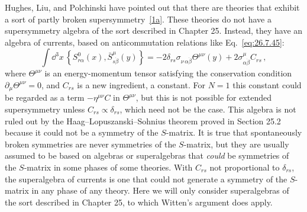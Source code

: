 Hughes, Liu, and Polchinski have pointed out that there are theories that
exhibit a sort of partly broken
supersymmetry~\hyperref[ch29-ref-1a]{[1a]}. These theories do not have a
supersymmetry algebra of the sort described in Chapter 25. Instead, they
have an algebra of currents, based on anticommutation relations like
Eq.~\eqref{eq:26.7.45}:
\[
  \int \dd^3x\,
  \left\{S^0_{r\alpha}(x),\bar S^\mu_{s\dot\beta}(y)\right\}
  =
  -2\delta_{rs}\sigma_{\nu\,\alpha\dot\beta}
    \Theta^{\mu\nu}(y)
  +2\sigma^\mu_{\alpha\dot\beta}C_{rs}\,,
\]
where \(\Theta^{\mu\nu}\) is an energy-momentum tensor satisfying the
conservation condition \(\partial_\mu\Theta^{\mu\nu}=0\), and \(C_{rs}\)
is a new ingredient, a constant. For \(N=1\) this constant could be
regarded as a term \(-\eta^{\mu\nu}C\) in \(\Theta^{\mu\nu}\), but this is
not possible for extended supersymmetry unless
\(C_{rs}\propto\delta_{rs}\), which need not be the case. This algebra is
not ruled out by the Haag--Lopuszanski--Sohnius theorem proved in
Section 25.2 because it could not be a symmetry of the \(S\)-matrix. It is
true that spontaneously broken symmetries are never symmetries of the
\(S\)-matrix, but they are usually assumed to be based on algebras or
superalgebras that \emph{could} be symmetries of the \(S\)-matrix in some
phases of some theories. With \(C_{rs}\) not proportional to
\(\delta_{rs}\), the superalgebra of currents is one that could not
generate a symmetry of the \(S\)-matrix in any phase of any theory. Here
we will only consider superalgebras of the sort described in Chapter 25,
to which Witten's argument does apply.

